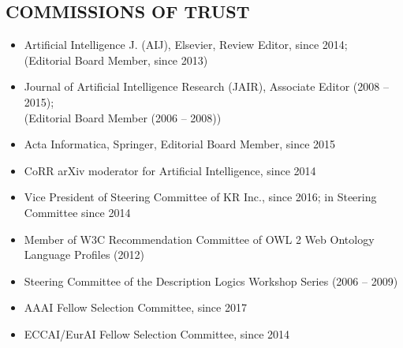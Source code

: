 \subsection*{COMMISSIONS OF TRUST}
\vspace{-2ex}
\begin{itemize}
\item Artificial Intelligence J. (AIJ), Elsevier, Review Editor, since 2014;\\
(Editorial Board Member, since 2013)
\item  Journal 
of Artificial Intelligence Research (JAIR), Associate Editor (2008 -- 2015);\\
(Editorial Board Member (2006 -- 2008))
\item  Acta Informatica, Springer, Editorial Board Member, since 2015
\item  CoRR arXiv moderator for Artificial Intelligence, since 2014

\item Vice President of Steering Committee of KR Inc., since 2016; in Steering Committee since 2014
\item Member of W3C Recommendation Committee of  OWL 2 Web Ontology Language 
Profiles (2012) %
\item  Steering Committee of the Description Logics Workshop Series (2006 -- 2009)
\item AAAI Fellow Selection Committee, since 2017
\item ECCAI/EurAI Fellow Selection Committee, since 2014

\end{itemize}


